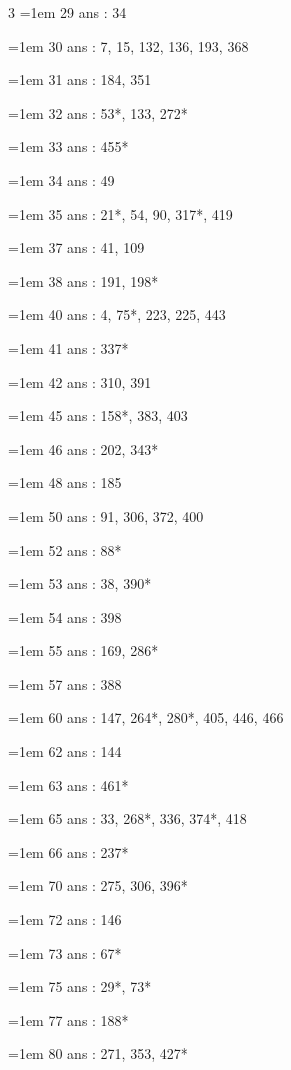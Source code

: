 \begin{multicols}{3}
\hangindent=1em 29 ans : 34\par
\hangindent=1em 30 ans : 7, 15, 132, 136, 193, 368\par
\hangindent=1em 31 ans : 184, 351\par
\hangindent=1em 32 ans : 53*, 133, 272*\par
\hangindent=1em 33 ans : 455*\par
\hangindent=1em 34 ans : 49\par
\hangindent=1em 35 ans : 21*, 54, 90, 317*, 419\par
\hangindent=1em 37 ans : 41, 109\par
\hangindent=1em 38 ans : 191, 198*\par
\hangindent=1em 40 ans : 4, 75*, 223, 225, 443\par
\hangindent=1em 41 ans : 337*\par
\hangindent=1em 42 ans : 310, 391\par
\hangindent=1em 45 ans : 158*, 383, 403\par
\hangindent=1em 46 ans : 202, 343*\par
\hangindent=1em 48 ans : 185\par
\hangindent=1em 50 ans : 91, 306, 372, 400\par
\hangindent=1em 52 ans : 88*\par
\hangindent=1em 53 ans : 38, 390*\par
\hangindent=1em 54 ans : 398\par
\hangindent=1em 55 ans : 169, 286*\par
\hangindent=1em 57 ans : 388\par
\hangindent=1em 60 ans : 147, 264*, 280*, 405, 446, 466\par
\hangindent=1em 62 ans : 144\par
\hangindent=1em 63 ans : 461*\par
\hangindent=1em 65 ans : 33, 268*, 336, 374*, 418\par
\hangindent=1em 66 ans : 237*\par
\hangindent=1em 70 ans : 275, 306, 396*\par
\hangindent=1em 72 ans : 146\par
\hangindent=1em 73 ans : 67*\par
\hangindent=1em 75 ans : 29*, 73*\par
\hangindent=1em 77 ans : 188*\par
\hangindent=1em 80 ans : 271, 353, 427*\par\end{multicols}
